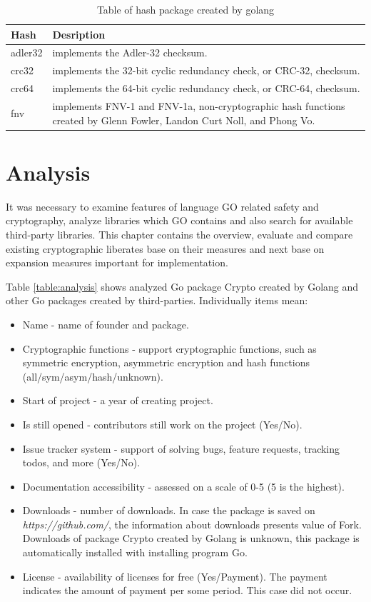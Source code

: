 \documentclass[
  digital, %
  notable,   %
  lof,     %
  lot,     %
]{fithesis3}
\begin{document}
\begin{table}[th]
\begin{tabular}{|p{1.5cm} p{10.5cm}|}
\hline
Hash & Desription \\
\hline
adler32 & implements the Adler-32 checksum. \\
crc32 & implements the 32-bit cyclic redundancy check, or CRC-32, checksum. \\
crc64 & implements the 64-bit cyclic redundancy check, or CRC-64, checksum. \\
fnv & implements FNV-1 and FNV-1a, non-cryptographic hash functions created by Glenn Fowler, Landon Curt Noll, and Phong Vo. \\
\hline
\end{tabular}
\caption{Table of hash package created by golang} 
\label{table:hash} 
\end{table}

\chapter{Analysis}
It was necessary to examine features of language GO related safety and cryptography, analyze 
libraries which GO contains and also search for available third-party libraries. This chapter 
contains the overview, evaluate and compare existing cryptographic liberates base on their 
measures and next base on expansion measures important for implementation.

Table \ref{table:analysis} shows analyzed Go package Crypto created by Golang and other Go 
packages created by third-parties. Individually items mean:
\vskip0.1in
\begin{itemize}[leftmargin=2em,rightmargin=1em,itemsep=0.75\parskip,parsep=0em,topsep=0em,partopsep=0em]
\item Name - name of founder and package.
\item Cryptographic functions - support cryptographic functions, such as symmetric encryption, asymmetric encryption and hash functions (all/sym/asym/hash/unknown).
\item Start of project - a year of creating project.
\item Is still opened - contributors still work on the project (Yes/No).
\item Issue tracker system - support of solving bugs, feature requests, tracking todos, and more (Yes/No).
\item Documentation accessibility - assessed on a scale of 0-5 (5 is the highest).
\item Downloads - number of downloads. In case the package is saved on \textit{https://github.com/}, the information about downloads presents value of Fork. Downloads of package Crypto created by Golang is unknown, this package is automatically installed with installing program Go.  
\item License - availability of licenses for free (Yes/Payment). The payment indicates the amount of payment per some period. This case did not occur.
\end{itemize}
\vskip0.1in
\end{document}
